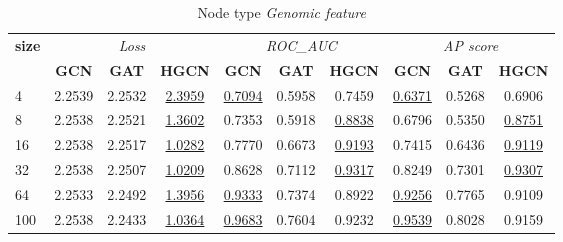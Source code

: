 \begin{table}
    \begin{subtable}[t]{\textwidth}
        \centering
        \begin{tabular}{l|ccc|ccc|ccc}      
            \toprule
            \multirow{2}{*}{\textbf{size}} & \multicolumn{3}{c|}{\textit{Loss}} & \multicolumn{3}{c|}{\textit{ROC\_AUC}} & \multicolumn{3}{c}{\textit{AP score}} \\
            & \textbf{GCN} & \textbf{GAT} & \textbf{HGCN} & \textbf{GCN} & \textbf{GAT} & \textbf{HGCN} & \textbf{GCN} & \textbf{GAT} & \textbf{HGCN} \\
            \midrule
            4 & 2.2539 & 2.2532 & \underline{2.3959} & \underline{0.7094} & 0.5958 & 0.7459 & \underline{0.6371} & 0.5268 & 0.6906 \\
            8 & 2.2538 & 2.2521 & \underline{1.3602} & 0.7353 & 0.5918 & \underline{0.8838} & 0.6796 & 0.5350 & \underline{0.8751} \\
            16 & 2.2538 & 2.2517 & \underline{1.0282} & 0.7770 & 0.6673 & \underline{0.9193} & 0.7415 & 0.6436 & \underline{0.9119} \\
            32 & 2.2538 & 2.2507 & \underline{1.0209} & 0.8628 & 0.7112 & \underline{0.9317} & 0.8249 & 0.7301 & \underline{0.9307} \\
            64 & 2.2533 & 2.2492 & \underline{1.3956} & \underline{0.9333} & 0.7374 & 0.8922 & \underline{0.9256} & 0.7765 & 0.9109 \\
            100 & 2.2538 & 2.2433 & \underline{1.0364} & \underline{0.9683} & 0.7604 & 0.9232 & \underline{0.9539} & 0.8028 & 0.9159 \\
            \bottomrule
        \end{tabular}
        \caption{Node type \textit{Genomic feature}}
    \end{subtable}
    
    \vspace{1em}
    

\end{table}
